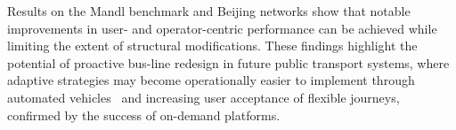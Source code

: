 \documentclass[a4paper,fleqn]{cas-sc}
\begin{document}
Results on the Mandl benchmark and Beijing networks show that notable improvements in user- and operator-centric performance can be achieved while limiting the extent of structural modifications. These findings highlight the potential of proactive bus-line redesign in future public transport systems, where adaptive strategies may become operationally easier to implement through automated vehicles~\citep{FagnantKockelman2015} and increasing user acceptance of flexible journeys, confirmed by the success of on-demand platforms.

%
%

\end{document}
